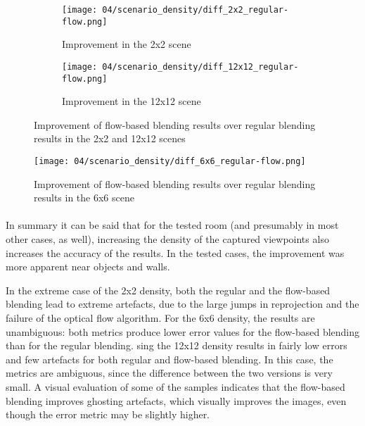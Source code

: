 \begin{figure}
\centering
    \hfill
    \begin{subfigure}[b]{0.45\textwidth}
            \centering
            \texttt{[image: 04/scenario\_density/diff\_2x2\_regular-flow.png]}
            \caption{Improvement in the 2x2 scene}
    \end{subfigure}
    \hfill
    \begin{subfigure}[b]{0.45\textwidth}
            \centering
            \texttt{[image: 04/scenario\_density/diff\_12x12\_regular-flow.png]}
            \caption{Improvement in the 12x12 scene}
    \end{subfigure}
    \hfill
  \caption[Improvement of flow-based blending results over regular blending results in the 2x2 and 12x12 scenes]{Improvement of flow-based blending results over regular blending results in the 2x2 and 12x12 scenes} \label{fig:dens_diff_2x2_12x12}
\end{figure}

\begin{figure}
		\centering
		\texttt{[image: 04/scenario\_density/diff\_6x6\_regular-flow.png]}
		\caption[]{Improvement of flow-based blending results over regular blending results in the 6x6 scene}
		\label{fig:dens_diff_6x6}
\end{figure}

\paragraph{}
In summary it can be said that for the tested room (and presumably in most other cases, as well), increasing the density of the captured viewpoints also increases the accuracy of the results. In the tested cases, the improvement was more apparent near objects and walls.

In the extreme case of the 2x2 density, both the regular and the flow-based blending lead to extreme artefacts, due to the large jumps in reprojection and the failure of the optical flow algorithm.
For the 6x6 density, the results are unambiguous: both metrics produce lower error values for the flow-based blending than for the regular blending.
sing the 12x12 density results in fairly low errors and few artefacts for both regular and flow-based blending. In this case, the metrics are ambiguous, since the difference between the two versions is very small. A visual evaluation of some of the samples indicates that the flow-based blending improves ghosting artefacts, which visually improves the images, even though the error metric may be slightly higher.















